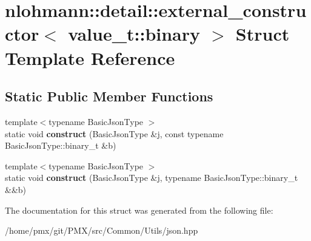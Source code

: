 \hypertarget{structnlohmann_1_1detail_1_1external__constructor_3_01value__t_1_1binary_01_4}{}\section{nlohmann\+:\+:detail\+:\+:external\+\_\+constructor$<$ value\+\_\+t\+:\+:binary $>$ Struct Template Reference}
\label{structnlohmann_1_1detail_1_1external__constructor_3_01value__t_1_1binary_01_4}
\subsection*{Static Public Member Functions}
\begin{DoxyCompactItemize}
\item 
\mbox{\label{structnlohmann_1_1detail_1_1external__constructor_3_01value__t_1_1binary_01_4_a0ff0da4f9a4d27955961477102c50a27}} 
{\footnotesize template$<$typename Basic\+Json\+Type $>$ }\\static void {\bfseries construct} (Basic\+Json\+Type \&j, const typename Basic\+Json\+Type\+::binary\+\_\+t \&b)
\item 
\mbox{\label{structnlohmann_1_1detail_1_1external__constructor_3_01value__t_1_1binary_01_4_a1c478157dc8bad20f09572c5b2406150}} 
{\footnotesize template$<$typename Basic\+Json\+Type $>$ }\\static void {\bfseries construct} (Basic\+Json\+Type \&j, typename Basic\+Json\+Type\+::binary\+\_\+t \&\&b)
\end{DoxyCompactItemize}


The documentation for this struct was generated from the following file\+:\begin{DoxyCompactItemize}
\item 
/home/pmx/git/\+P\+M\+X/src/\+Common/\+Utils/json.\+hpp\end{DoxyCompactItemize}
